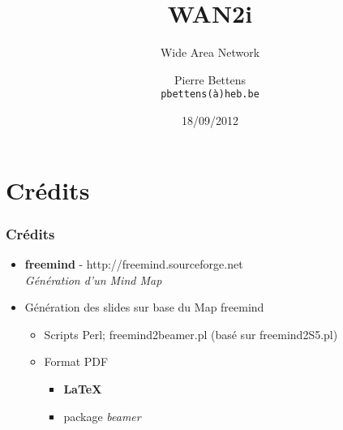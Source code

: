 \documentclass[a4paper,compress,13pt]{beamer}
\title{WAN2i}%
\subtitle{Wide Area Network}
\author[Pierre {\sc Bettens}]{Pierre {\sc Bettens} \\ \small \texttt{pbettens(\`a)heb.be}}
\institute{ÉSI - École Supérieure d'Informatique}
\date{18/09/2012}
\begin{document}
\begin{frame}[fragile]
	\titlepage
\end{frame}







\section{Crédits}

\begin{frame}[fragile]
  \frametitle{Crédits}
\begin{itemize}
	\item \textbf{freemind} - http://freemind.sourceforge.net  \\ 
	\textit{Génération d'un Mind Map}
	\item Génération des slides sur base du Map freemind 
	\begin{itemize}
		\item Scripts Perl; freemind2beamer.pl (basé sur freemind2S5.pl)
		\item Format PDF
		\begin{itemize}
			\item \textbf{ \LaTeX }
			\item package \textit{beamer} 
		\end{itemize}
	\end{itemize}
\end{itemize}
\end{frame}
\end{document}
